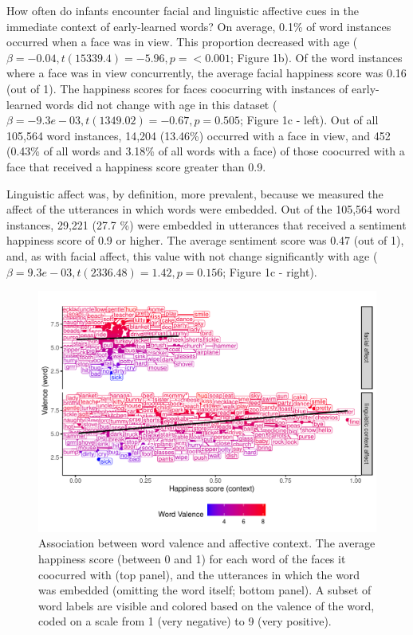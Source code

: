 \documentclass[10pt, letterpaper]{article}
\begin{document}
How often do infants encounter facial and linguistic affective cues in
the immediate context of early-learned words? On average, 0.1\% of word
instances occurred when a face was in view. This proportion decreased
with age
(\(\beta = -0.04, \textit{t}(15339.4) = -5.96, \textit{p} = < 0.001\);
Figure 1b). Of the word instances where a face was in view concurrently,
the average facial happiness score was 0.16 (out of 1). The happiness
scores for faces coocurring with instances of early-learned words did
not change with age in this dataset
(\(\beta = -9.3e-03, \textit{t}(1349.02) = -0.67, \textit{p} = 0.505\);
Figure 1c - left). Out of all 105,564 word instances, 14,204 (13.46\%)
occurred with a face in view, and 452 (0.43\% of all words and 3.18\% of
all words with a face) of those coocurred with a face that received a
happiness score greater than 0.9.

Linguistic affect was, by definition, more prevalent, because we
measured the affect of the utterances in which words were embedded. Out
of the 105,564 word instances, 29,221 (27.7 \%) were embedded in
utterances that received a sentiment happiness score of 0.9 or higher.
The average sentiment score was 0.47 (out of 1), and, as with facial
affect, this value with not change significantly with age
(\(\beta = 9.3e-03, \textit{t}(2336.48) = 1.42, \textit{p} = 0.156\);
Figure 1c - right).

\begin{CodeChunk}
\begin{figure}[h]

{\centering \includegraphics{figs/figure2-1} 

}

\caption[Association between word valence and affective context]{Association between word valence and affective context. The average happiness score (between 0 and 1) for each word of the faces it coocurred with (top panel), and the utterances in which the word was embedded (omitting the word itself; bottom panel). A subset of word labels are visible and colored based on the valence of the word, coded on a scale from 1 (very negative) to 9 (very positive).}\label{fig:figure2}
\end{figure}
\end{CodeChunk}
\end{document}
